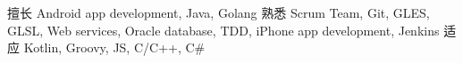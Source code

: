 
\begin{cvskills}
	\cvskill
		{擅长}
		{Android app development, Java, Golang}
	\cvskill
		{熟悉}
		{Scrum Team, Git, GLES, GLSL, Web services, Oracle database, TDD, iPhone app development, Jenkins}
	\cvskill
		{适应}
		{Kotlin, Groovy, JS, C/C++, C\#}
\end{cvskills}


